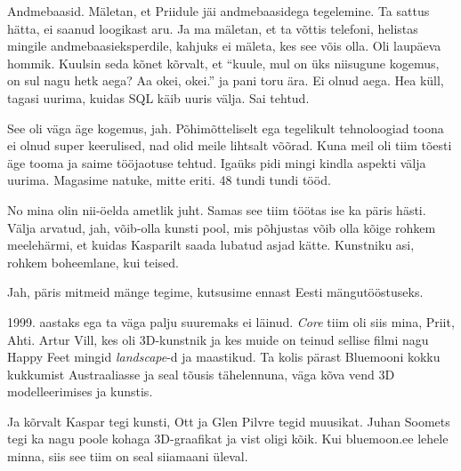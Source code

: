 
Andmebaasid. Mäletan, et Priidule jäi andmebaasidega tegelemine. Ta sattus hätta, ei saanud  loogikast aru. Ja ma mäletan, et ta võttis telefoni, helistas mingile andmebaasieksperdile, kahjuks ei mäleta, kes see võis olla. Oli laupäeva hommik. Kuulsin seda kõnet kõrvalt, et \enquote{kuule, mul on üks niisugune kogemus, on sul nagu hetk aega? Aa okei, okei.} ja pani toru ära. Ei olnud aega. Hea küll, tagasi uurima, kuidas SQL  käib uuris välja. Sai tehtud.


See oli väga äge kogemus, jah. Põhimõtteliselt ega tegelikult tehnoloogiad toona ei olnud super keerulised, nad olid meile lihtsalt võõrad. Kuna meil oli tiim tõesti äge tooma ja saime tööjaotuse tehtud. Igaüks pidi mingi kindla aspekti välja uurima. Magasime natuke, mitte eriti. 48 tundi tundi tööd.


No mina olin nii-öelda ametlik juht. Samas see tiim töötas ise ka päris hästi. Välja arvatud, jah, võib-olla kunsti pool, mis põhjustas võib olla kõige rohkem meelehärmi, et kuidas Kasparilt saada lubatud asjad kätte. Kunstniku asi, rohkem boheemlane, kui teised.


Jah, päris mitmeid mänge tegime, kutsusime ennast Eesti mängutööstuseks. 


1999. aastaks ega ta väga palju suuremaks ei läinud. \emph{Core} tiim oli siis mina, Priit, Ahti. Artur Vill, kes oli 3D-kunstnik ja kes muide on teinud sellise filmi nagu Happy Feet mingid \emph{landscape}-d ja maastikud. Ta kolis pärast Bluemooni kokku kukkumist Austraaliasse ja seal tõusis tähelennuna, väga kõva vend 3D modelleerimises ja kunstis.

Ja kõrvalt Kaspar tegi kunsti, Ott ja Glen Pilvre tegid muusikat. Juhan Soomets tegi ka nagu poole kohaga 3D-graafikat ja vist oligi kõik. Kui bluemoon.ee lehele minna, siis see tiim on seal siiamaani üleval.

